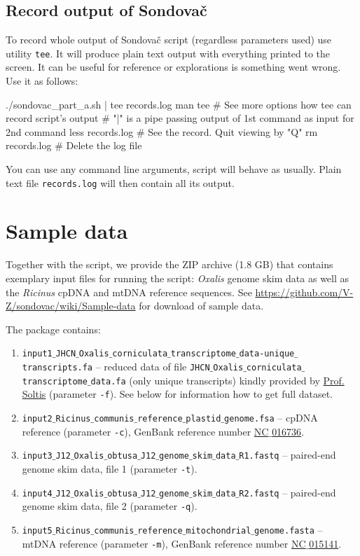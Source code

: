 \documentclass[a4paper, 11pt, twoside]{article}
\begin{document}
\subsection{Record output of Sondovač}

To record whole output of Sondovač script (regardless parameters used) use utility \texttt{tee}. It will produce plain text output with everything printed to the screen. It can be useful for reference or explorations is something went wrong. Use it as follows:

\begin{bashcode}
  ./sondovac_part_a.sh | tee records.log
  man tee # See more options how tee can record script's output
  # "|" is a pipe passing output of 1st command as input for 2nd command
  less records.log # See the record. Quit viewing by "Q"
  rm records.log # Delete the log file
\end{bashcode}

You can use any command line arguments, script will behave as usually. Plain text file \texttt{records.log} will then contain all its output.

\section{Sample data}

Together with the script, we provide the ZIP archive (1.8 GB) that contains exemplary input files for running the script: \textit{Oxalis} genome skim data as well as the \textit{Ricinus} cpDNA and mtDNA reference sequences. See \href{https://github.com/V-Z/sondovac/wiki/Sample-data}{https://github.com/V-Z/sondovac/wiki/Sample-data} for download of sample data.

The package contains:

\begin{enumerate}
 \item \texttt{input1$\_$JHCN$\_$Oxalis$\_$corniculata$\_$transcriptome$\_$data-unique$\_$transcripts.fa} -- reduced data of file \texttt{JHCN$\_$Oxalis$\_$corniculata$\_$transcriptome$\_$data.fa} (only unique transcripts) kindly provided by \href{http://www.flmnh.ufl.edu/museum-voices/soltis-lab/doug-soltis/}{Prof. Soltis} (parameter \texttt{-f}). See below for information how to get full dataset.
  \item \texttt{input2$\_$Ricinus$\_$communis$\_$reference$\_$plastid$\_$genome.fsa} -- cpDNA reference (pa\-ra\-meter \texttt{-c}), GenBank reference number \href{http://www.ncbi.nlm.nih.gov/nuccore/372450118/}{NC$\_$016736}.
  \item \texttt{input3$\_$J12$\_$Oxalis$\_$obtusa$\_$J12$\_$genome$\_$skim$\_$data$\_$R1.fastq} -- paired-end genome skim data, file 1 (parameter \texttt{-t}).
  \item \texttt{input4$\_$J12$\_$Oxalis$\_$obtusa$\_$J12$\_$genome$\_$skim$\_$data$\_$R2.fastq} -- paired-end genome skim data, file 2 (parameter \texttt{-q}).
  \item \texttt{input5$\_$Ricinus$\_$communis$\_$reference$\_$mitochondrial$\_$genome.fasta} -- mtDNA reference (parameter \texttt{-m}), GenBank reference number \href{http://www.ncbi.nlm.nih.gov/nuccore/323649872/}{NC$\_$015141}.
\end{enumerate}
\end{document}
